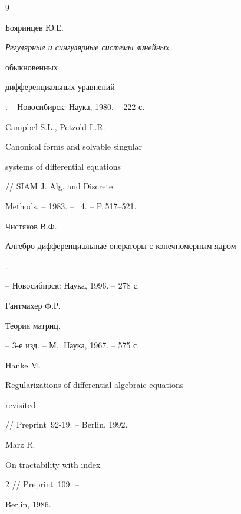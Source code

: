 \begin{thebibliography}{9}







Бояринцев Ю.Е. {\em Регулярные и сингулярные системы линейных


обыкновенных


дифференциальных уравнений}. -- Новосибирск: Наука, 1980. -- 222 с.







Campbel S.L., Petzold L.R. {\em


Canonical forms and solvable singular


systems of differential equations} // SIAM J. Alg. and Discrete


Methods. -- 1983. -- \No.\,4. -- P.\,517--521.







Чистяков В.Ф. {\em


Алгебро-дифференциальные операторы с конечномерным ядром}.


-- Новосибирск: Наука, 1996. -- 278 с.







Гантмахер Ф.Р. {\em


Теория матриц.} -- 3-е изд. -- М.: Наука, 1967. -- 575 с.







Hanke M. {\em


Regularizations of differential-algebraic equations


revisited} // Preprint \No\,92-19. -- Berlin, 1992.







Marz R. {\em


On tractability with index} 2 // Preprint \No\,109. --


Berlin, 1986.





\end{thebibliography}





\vskip 2cm

















